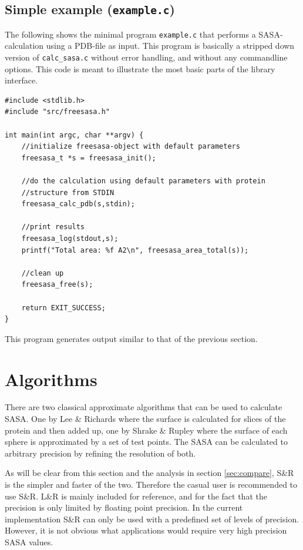 \documentclass[a4paper,11pt]{article}
\begin{document}
\subsection{Simple example (\texttt{example.c})}\label{sec:simple_sample}

The following shows the minimal program \texttt{example.c} that
performs a SASA-calculation using a PDB-file as input. This program is
basically a stripped down version of \texttt{calc\_sasa.c} without
error handling, and without any commandline options. This code is
meant to illustrate the most basic parts of the library interface.
\begin{verbatim}
#include <stdlib.h>
#include "src/freesasa.h"

int main(int argc, char **argv) { 
    //initialize freesasa-object with default parameters
    freesasa_t *s = freesasa_init();

    //do the calculation using default parameters with protein
    //structure from STDIN
    freesasa_calc_pdb(s,stdin);

    //print results
    freesasa_log(stdout,s);
    printf("Total area: %f A2\n", freesasa_area_total(s));

    //clean up
    freesasa_free(s);

    return EXIT_SUCCESS;
}
\end{verbatim}
This program generates output similar to that of the previous
section.

\section{Algorithms}\label{sec:alg}

There are two classical approximate algorithms that can be used to
calculate SASA. One by Lee \& Richards \cite{LnR} where the surface is
calculated for slices of the protein and then added up, one by Shrake
\& Rupley \cite{SnR} where the surface of each sphere is approximated
by a set of test points. The SASA can be calculated to arbitrary
precision by refining the resolution of both.

As will be clear from this section and the analysis in section
\ref{sec:compare}, S\&R is the simpler and faster of the
two. Therefore the casual user is recommended to use S\&R. L\&R is
mainly included for reference, and for the fact that the precision is
only limited by floating point precision. In the current
implementation S\&R can only be used with a predefined set of levels
of precision. However, it is not obvious what applications would
require very high precision SASA values.
\end{document}
